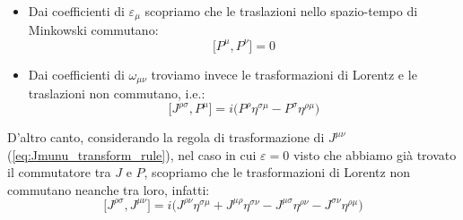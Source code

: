 \documentclass[../main.tex]{subfiles}
\begin{document}
\begin{exercise}
    \begin{itemize}
        \item Dai coefficienti di \(\varepsilon_{\mu}\) scopriamo che le traslazioni nello spazio-tempo di Minkowski commutano:
        \begin{equation}
            \boxed{\big[P^\mu, P^\nu\big] = 0}
            \label{eq:P_commutator}
        \end{equation}
        \item Dai coefficienti di \(\omega_{\mu\nu}\) troviamo invece le trasformazioni di Lorentz e le traslazioni non commutano, i.e.:
        \begin{equation}
            \boxed{\big[ J^{\rho\sigma}, P^\mu \big] = i\big( P^\rho\eta^{\sigma\mu} - P^\sigma\eta^{\rho\mu} \big)}
            \label{eq:JP_commutator}
        \end{equation}
    \end{itemize}
    D'altro canto, considerando la regola di trasformazione di $J^{\mu\nu}$ (\ref{eq:Jmunu_transform_rule}), nel caso in cui $\varepsilon=0$ visto che abbiamo già trovato il commutatore tra $J$ e $P$, scopriamo che le trasformazioni di Lorentz non commutano neanche tra loro, infatti:
    \begin{equation}
        \boxed{\big[ J^{\rho\sigma}, J^{\mu\nu} \big] = i\big( J^{\rho\nu}\eta^{\sigma\mu} + J^{\mu\rho}\eta^{\sigma\nu} - J^{\mu\sigma}\eta^{\rho\nu} - J^{\sigma\nu}\eta^{\rho\mu} \big)}
        \label{eq:JJ_commutator}
    \end{equation}
    \label{ex:poincare_algebra}
\end{exercise}
\end{document}
